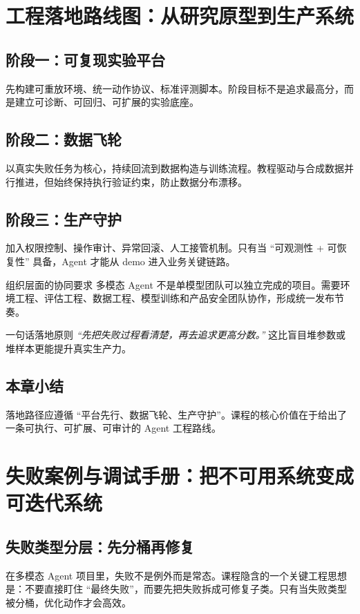 \documentclass[a4paper]{article}
\begin{document}
\section{工程落地路线图：从研究原型到生产系统}

\subsection{阶段一：可复现实验平台}
先构建可重放环境、统一动作协议、标准评测脚本。阶段目标不是追求最高分，而是建立可诊断、可回归、可扩展的实验底座。

\subsection{阶段二：数据飞轮}
以真实失败任务为核心，持续回流到数据构造与训练流程。教程驱动与合成数据并行推进，但始终保持执行验证约束，防止数据分布漂移。

\subsection{阶段三：生产守护}
加入权限控制、操作审计、异常回滚、人工接管机制。只有当 ``可观测性 + 可恢复性'' 具备，Agent 才能从 demo 进入业务关键链路。

\begin{knowledgebox}{组织层面的协同要求}
多模态 Agent 不是单模型团队可以独立完成的项目。需要环境工程、评估工程、数据工程、模型训练和产品安全团队协作，形成统一发布节奏。
\end{knowledgebox}

\begin{importantbox}{一句话落地原则}
\textit{``先把失败过程看清楚，再去追求更高分数。''} 这比盲目堆参数或堆样本更能提升真实生产力。
\end{importantbox}

\subsection{本章小结}
落地路径应遵循 ``平台先行、数据飞轮、生产守护''。课程的核心价值在于给出了一条可执行、可扩展、可审计的 Agent 工程路线。

\section{失败案例与调试手册：把不可用系统变成可迭代系统}

\subsection{失败类型分层：先分桶再修复}
在多模态 Agent 项目里，失败不是例外而是常态。课程隐含的一个关键工程思想是：不要直接盯住 ``最终失败''，而要先把失败拆成可修复子类。只有当失败类型被分桶，优化动作才会高效。
\end{document}
